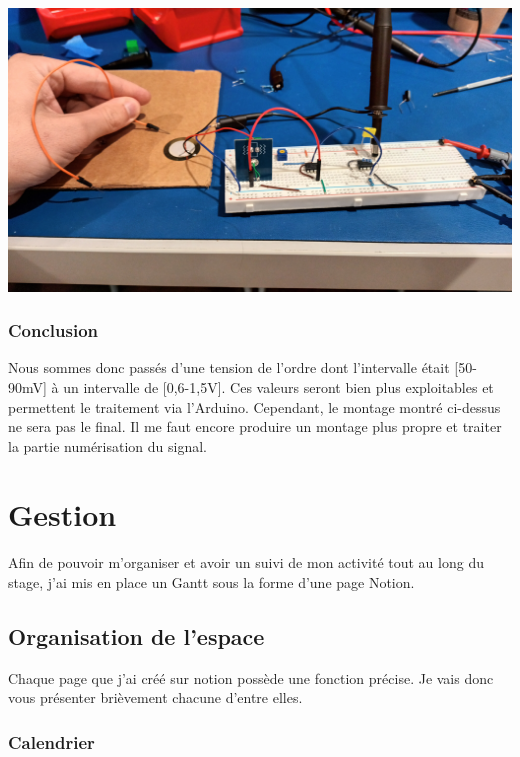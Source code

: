 \documentclass[11pt,french,a4paper]{article}
\begin{document}
\begin{center}	
\includegraphics[scale=0.1]{../img/froty.jpg}
\label{M}
\end{center}

\subsubsection{Conclusion}
Nous sommes donc passés d’une tension de l’ordre dont l’intervalle était [50-90mV] à un intervalle de [0,6-1,5V]. Ces valeurs seront bien plus exploitables et permettent le traitement via l’Arduino.
Cependant, le montage montré ci-dessus ne sera pas le final. Il me faut encore produire un montage plus propre et traiter la partie numérisation du signal.

\newpage
\section{Gestion}
Afin de pouvoir m'organiser et avoir un suivi de mon activité tout au long du stage, j'ai mis en place un Gantt sous la forme d'une page Notion.

\subsection{Organisation de l'espace }
Chaque page que j'ai créé sur notion possède une fonction précise. Je vais donc vous présenter brièvement chacune d'entre elles.
\subsubsection{Calendrier}
\end{document}
